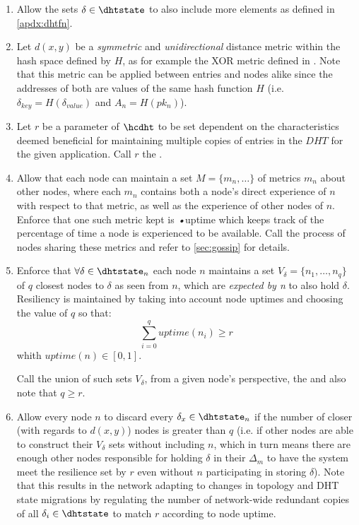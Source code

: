 \documentclass[twocolumn,showpacs,%
  nofootinbib,aps,superscriptaddress,%
  eqsecnum,prd,notitlepage,showkeys,10pt]{revtex4-1}
\begin{document}
\begin{enumerate}
\begin{enumerate}
\item Allow the sets $\delta \in \dhtstate$ to also include more elements as defined in  \ref{apdx:dhtfn}.

\item Let $d(x,y)$ be a \textit{symmetric} and \textit{unidirectional} distance metric within the hash space defined by $H$, as for example the XOR metric defined in \cite{kademlia}. Note that this metric can be applied between entries and nodes alike since the addresses of both are values of the same hash function $H$ (i.e. $\delta_{key}=H(\delta_{value})$ and $A_n=H(pk_n)$).

\item Let $r$ be a parameter of $\hcdht$ to be set dependent on the characteristics deemed beneficial for maintaining multiple copies of entries in the $DHT$ for the given application.
Call $r$ the .

\label{dht:metrics}
\item Allow that each node can maintain a set $M = \{m_n, \dots \}$ of metrics $m_n$ about other nodes, where each $m_n$ contains both a node's direct experience of $n$ with respect to that metric, as well as the experience of other nodes of $n$.  Enforce that one such metric kept is \textit{•}{uptime} which keeps track of the percentage of time a node is experienced to be available.   Call the process of nodes sharing these metrics  and refer to \ref{sec:gossip} for details.

\item  Enforce that $\forall \delta \in \dhtstate_n$ each node $n$ maintains a set $V_\delta = \{n_1,\dots,n_q\}$ of $q$ closest nodes to $\delta$ as seen from $n$, which are \textit{expected by n} to also hold $\delta$. Resiliency is maintained by taking into account node uptimes and choosing the value of $q$ so that:
\begin{equation}
\sum_{i=0}^q uptime(n_i)\geq r
\end{equation}
whith $uptime(n) \in [0,1]$.

Call the union of such sets $V_\delta$, from a given node's perspective, the  and also note that $q\geq r$.

\item \label{hc:shards} Allow every node $n$ to discard every $\delta_x \in \dhtstate_n$ if the number of closer (with regards to $d(x,y)$) nodes is greater than $q$
(i.e. if other nodes are able to construct their $V_\delta$ sets without including $n$, which in turn means there are enough other nodes responsible for holding $\delta$ in their $\Delta_m$ to have the system meet the resilience set by $r$ even without $n$ participating in storing $\delta$).
Note that this results in the network adapting to changes in topology and DHT state migrations by regulating the number of network-wide redundant copies of all $\delta_i\in\dhtstate$ to match $r$ according to node uptime.


\end{enumerate}
\end{enumerate}
\end{document}
